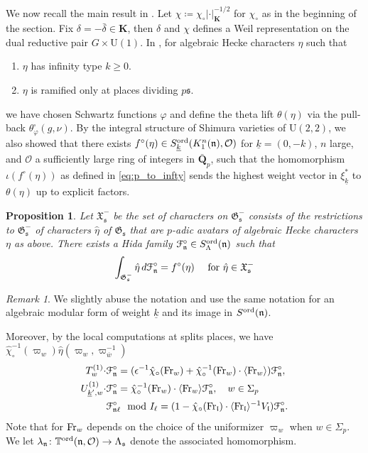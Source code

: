\documentclass[leqno]{amsart}
\newtheorem{prop}[thm]{Proposition}
\theoremstyle{definition}
\theoremstyle{remark}
\newtheorem{rem}[thm]{Remark}
\newcommand{\oo}{\mathcal{O}}
\newcommand{\Q}{{\mathbf{Q}}}
\newcommand{\Fr}{\textnormal{Fr}} %
\newcommand{\fs}{\mathfrak{s}}
\newcommand{\fn}{\mathfrak{n}}
\newcommand{\fl}{\mathfrak{l}}
\newcommand{\K}{{\mathbf{K}}} %
\newcommand{\bw}{\overline{w}}
\newcommand{\fG}{\mathfrak{G}}
\newcommand{\fX}{\mathfrak{X}}
\newcommand{\wt}[1]{\underline{ #1 }}
\newcommand{\TT}{\mathbb{T}} %
\newcommand{\euF}{\EuScript{F}} %
\newcommand{\ord}{\textnormal{ord}} %
\begin{document}
We now recall the main result in \cite{lee}.
Let $\chi\coloneqq \chi_\circ|\cdot|_\K^{-1/2}$
for $\chi_\circ$ as in the beginning of the section.
Fix $\delta=-\bar{\delta}\in \K$,
then $\delta$ and $\chi$
defines a Weil representation
on the dual reductive pair $G\times \mathrm{U}(1)$.
In \cite[\S 4]{lee},
for algebraic Hecke characters $\eta$ such that 
\begin{enumerate}
    \item $\eta$ has infinity type $k\geq 0$.
    \item $\eta$ is ramified only at places dividing $p\fs$.
\end{enumerate}
we have chosen Schwartz functions $\varphi$ 
and define the theta lift 
$\theta(\eta)$ via the pull-back
$\theta^\square_\varphi(g,\mathbb{\nu})$.
By the integral structure of Shimura varieties
of $\mathrm{U}(2,2)$,
we also showed that 
there exists  $f^\circ(\eta)\in 
S_{\wt{k}}^{\ord}(K^n_1(\fn),\oo)$
for $\wt{k}=(0,-k)$, $n$ large, and 
$\oo$ a sufficiently large ring of integers in $ \bar{\Q}_p$,
such that the homomorphism
$\iota(f^\circ(\eta))$ as defined in \eqref{eq:p_to_infty}
sends the highest weight vector in  $\xi_{\wt{k}}^*$
to $\theta(\eta)$ up to explicit factors.
\begin{prop}\cite[Thm 7.6]{lee}
	Let $\fX_{\fs}^-$ be the set of characters
	on $\fG_{\fs}^-$ consists of 
	the restrictions to $\fG_{\fs}^-$ of characters 
	$\hat{\eta}$ of $\fG_{\fs}$
	that are $p$-adic avatars of 
	algebraic  Hecke characters  $\eta$ as above.
	There exists a Hida family 
	$\euF^\circ_{\fn}\in S^{\ord}_\Lambda(\fn)$
	such that 
	\[
		\int_{\fG_{\fs}^-}\hat{\eta}\,d\euF^\circ_\fn
		=f^\circ(\eta)\quad
		\text{ for } \hat{\eta}\in \fX_{\fs}^-
	\]
\end{prop}
\begin{rem}
	We slightly abuse the notation
	and use the same notation 
	for an algebraic modular form of weight $\wt{k}$
	 and its image in $S^{\ord}(\fn)$.
\end{rem}

Moreover, by the local computations at splits
places, we have $\hat{\chi}^{-1}_\circ(\varpi_w)\hat{\eta}(\varpi_w,\varpi_{\bw}^{-1})$
\begin{align*}
	T_w^{(1)}\cdot &\euF^\circ_{\fn}=
	(\epsilon^{-1}\hat{\chi}_\circ(\Fr_w)
	+\hat{\chi}^{-1}_\circ(\Fr_w)\cdot 
	\langle \Fr_w\rangle )
	\euF^\circ_{\fn},\\
	U_{\wt{k}',w}^{(1)}\cdot &\euF^{\circ}_{\fn}=
	\hat{\chi}_\circ^{-1}(\Fr_w)\cdot 
	\langle \Fr_w\rangle
	\euF^{\circ}_{\fn},\quad w\in \Sigma_p\\
	 &\euF^\circ_{\fn\ell} \mod I_{\ell}=
	(1-\hat{\chi}_\circ(\Fr_\fl)\cdot 
	\langle \Fr_\fl\rangle^{-1} V_\fl)
	\euF^\circ_{\fn}.
\end{align*}
Note that for $\Fr_w$ depends on the 
choice of the uniformizer  $\varpi_w$ when  $w\in \Sigma_p$.
We let 
$\lambda_{\fn}\colon\TT^{\ord}(\fn,\oo)\to\Lambda_{\fs}$
denote the associated homomorphism.
\end{document}
